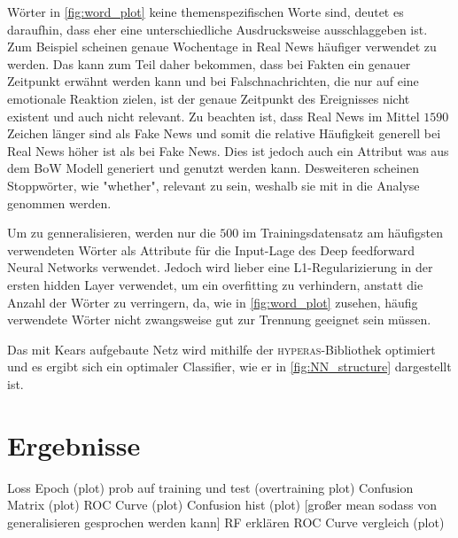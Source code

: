 Wörter in \ref{fig:word_plot} keine themenspezifischen Worte sind, deutet es daraufhin, dass eher eine unterschiedliche 
Ausdrucksweise ausschlaggeben ist. 
Zum Beispiel scheinen genaue Wochentage in Real News häufiger verwendet zu werden. 
Das kann zum Teil daher bekommen, dass bei Fakten ein genauer Zeitpunkt erwähnt werden kann und bei Falschnachrichten, die 
nur auf eine emotionale Reaktion zielen, ist der genaue Zeitpunkt des Ereignisses nicht existent und auch nicht relevant.
Zu beachten ist, dass Real News im Mittel $\num{1590}$ Zeichen länger sind als Fake News und somit die relative Häufigkeit 
generell bei Real News höher ist als bei Fake News. 
Dies ist jedoch auch ein Attribut was aus dem BoW Modell generiert und genutzt werden kann.
Desweiteren scheinen Stoppwörter, wie "whether", relevant zu sein, weshalb sie mit in die Analyse genommen werden.

Um zu genneralisieren, werden nur die $500$ im Trainingsdatensatz am häufigsten verwendeten Wörter als Attribute 
für die Input-Lage des Deep feedforward Neural Networks verwendet. 
Jedoch wird lieber eine L1-Regularizierung in der ersten hidden Layer verwendet, um ein overfitting zu verhindern, 
anstatt die Anzahl der Wörter zu verringern, da, wie in \ref{fig:word_plot} zusehen, häufig verwendete Wörter nicht 
zwangsweise gut zur Trennung geeignet sein müssen.

Das mit Kears\cite{keras} aufgebaute Netz wird mithilfe der \textsc{hyperas}-Bibliothek\cite{hyperas} optimiert und 
es ergibt sich ein optimaler Classifier, wie er in \ref{fig:NN_structure} dargestellt ist.


\chapter{Ergebnisse}
Loss Epoch (plot)
prob auf training und test (overtraining plot)
Confusion Matrix (plot)
ROC Curve (plot)
Confusion hist (plot) [großer mean sodass von generalisieren gesprochen werden kann]
RF erklären 
ROC Curve vergleich (plot)

